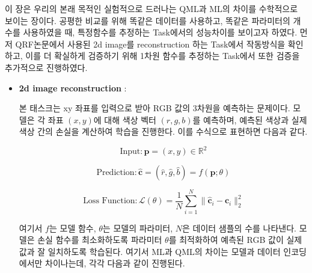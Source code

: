 이 장은 우리의 본래 목적인 실험적으로 드러나는 QML과 ML의 차이를 수학적으로 보이는 장이다. 공평한 비교를 위해 똑같은 데이터를 사용하고, 똑같은 파라미터의 개수를 사용하였을 때, 특정함수를 추정하는 Task에서의 성능차이를 보이고자 하였다. 먼저 QRF논문에서 사용된 2d image를 reconstruction 하는 Task에서 작동방식을 확인하고, 이를 더 확실하게 검증하기 위해 1차원 함수를 추정하는 Task에서 또한 검증을 추가적으로 진행하였다.
\begin{itemize}
    \item \textbf{2d image reconstruction} :

        본 태스크는 xy 좌표를 입력으로 받아 RGB 값의 3차원을 예측하는 문제이다. 모델은 각 좌표 \((x, y)\)에 대해 색상 벡터 \((r, g, b)\)를 예측하며, 예측된 색상과 실제 색상 간의 손실을 계산하여 학습을 진행한다. 이를 수식으로 표현하면 다음과 같다.

            \[
            \text{Input}: \mathbf{p} = (x, y) \in \mathbb{R}^2
            \]

            \[
            \text{Prediction}: \hat{\mathbf{c}} = (\hat{r}, \hat{g}, \hat{b}) = f(\mathbf{p}; \theta)
            \]

            \[
            \text{Loss Function}: \mathcal{L}(\theta) = \frac{1}{N} \sum_{i=1}^{N} \| \hat{\mathbf{c}}_i - \mathbf{c}_i \|_2^2
            \]




            여기서 \(f\)는 모델 함수, \(\theta\)는 모델의 파라미터, \(N\)은 데이터 샘플의 수를 나타낸다. 모델은 손실 함수를 최소화하도록 파라미터 \(\theta\)를 최적화하여 예측된 RGB 값이 실제 값과 잘 일치하도록 학습된다. 여기서 ML과 QML의 차이는 모델과 데이터 인코딩에서만 차이나는데, 각각 다음과 같이 진행된다.



\end{itemize}
